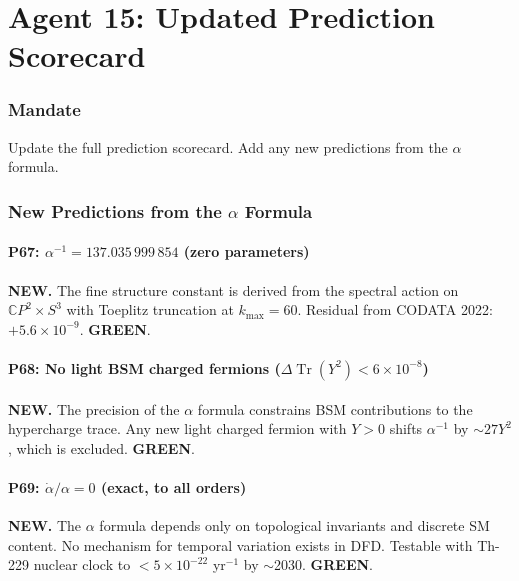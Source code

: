 \documentclass[11pt,a4paper]{article}
\newcommand{\GREEN}{\textcolor{dfdgreen}{\textbf{GREEN}}}
\newcommand{\Tr}{\operatorname{Tr}}
\newcommand{\CP}{\mathbb{C}P}
\begin{document}
\part{Agent 15: Updated Prediction Scorecard}
\label{part:agent15}

\section{Mandate}
Update the full prediction scorecard. Add any new predictions from the $\alpha$ formula.

\section{New Predictions from the $\alpha$ Formula}

\subsection{P67: $\alpha^{-1} = 137.035\,999\,854$ (zero parameters)}

\textbf{NEW.} The fine structure constant is derived from the spectral action on $\CP^2 \times S^3$ with Toeplitz truncation at $k_{\max} = 60$. Residual from CODATA 2022: $+5.6 \times 10^{-9}$. \GREEN{}.

\subsection{P68: No light BSM charged fermions ($\Delta\Tr(Y^2) < 6 \times 10^{-8}$)}

\textbf{NEW.} The precision of the $\alpha$ formula constrains BSM contributions to the hypercharge trace. Any new light charged fermion with $Y > 0$ shifts $\alpha^{-1}$ by $\sim 27 Y^2$, which is excluded. \GREEN{}.

\subsection{P69: $\dot{\alpha}/\alpha = 0$ (exact, to all orders)}

\textbf{NEW.} The $\alpha$ formula depends only on topological invariants and discrete SM content. No mechanism for temporal variation exists in DFD. Testable with Th-229 nuclear clock to $< 5 \times 10^{-22}$ yr$^{-1}$ by $\sim$2030. \GREEN{}.
\end{document}

